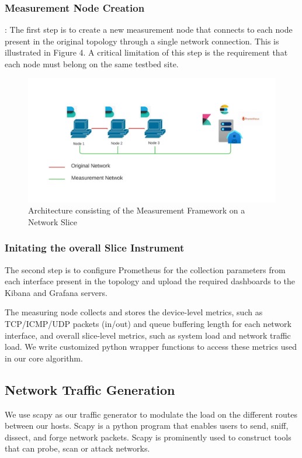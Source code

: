 \documentclass[conference]{IEEEtran}
\begin{document}
    \subsubsection{Measurement Node Creation}: The first step is to create a new measurement node that connects to each node present in the original topology through a single network connection. This is illustrated in Figure 4. A critical limitation of this step is the requirement that each node must belong on the same testbed site.

    \begin{figure}[h]
        \includegraphics[scale=0.45]{Mflib.jpeg}
        \centering
        \caption{Architecture consisting of the Measurement Framework on a Network Slice}
    \end{figure}

    \subsubsection{Initating the overall Slice Instrument} The second step is to configure Prometheus for the collection parameters from each interface present in the topology and upload the required dashboards to the Kibana and Grafana servers.


    The measuring node collects and stores the device-level metrics, such as TCP/ICMP/UDP packets (in/out) and queue buffering length for each network interface, and overall slice-level metrics, such as system load and network traffic load. We write customized python wrapper functions to access these metrics used in our core algorithm.

    \subsection{Network Traffic Generation}
    We use scapy as our traffic generator to modulate the load on the different routes between our hosts. Scapy is a python program that enables users to send, sniff, dissect, and forge network packets. Scapy is prominently used to construct tools that can probe, scan or attack networks.
\end{document}
